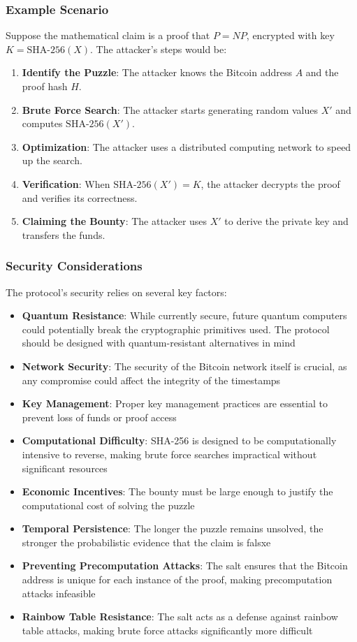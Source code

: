 \documentclass[12pt]{report}
\begin{document}
\subsubsection{Example Scenario}
Suppose the mathematical claim is a proof that \( P = NP \), encrypted with key \( K = \text{SHA-256}(X) \). The attacker's steps would be:

\begin{enumerate}
    \item \textbf{Identify the Puzzle}: The attacker knows the Bitcoin address \( A \) and the proof hash \( H \).
    \item \textbf{Brute Force Search}: The attacker starts generating random values \( X' \) and computes \( \text{SHA-256}(X') \).
    \item \textbf{Optimization}: The attacker uses a distributed computing network to speed up the search.
    \item \textbf{Verification}: When \( \text{SHA-256}(X') = K \), the attacker decrypts the proof and verifies its correctness.
    \item \textbf{Claiming the Bounty}: The attacker uses \( X' \) to derive the private key and transfers the funds.
\end{enumerate}

\subsubsection{Security Considerations}
The protocol's security relies on several key factors:
\begin{itemize}
    \item \textbf{Quantum Resistance}: While currently secure, future quantum computers could potentially break the cryptographic primitives used. The protocol should be designed with quantum-resistant alternatives in mind
    \item \textbf{Network Security}: The security of the Bitcoin network itself is crucial, as any compromise could affect the integrity of the timestamps
    \item \textbf{Key Management}: Proper key management practices are essential to prevent loss of funds or proof access
    \item \textbf{Computational Difficulty}: SHA-256 is designed to be computationally intensive to reverse, making brute force searches impractical without significant resources
    \item \textbf{Economic Incentives}: The bounty must be large enough to justify the computational cost of solving the puzzle
    \item \textbf{Temporal Persistence}: The longer the puzzle remains unsolved, the stronger the probabilistic evidence that the claim is falsxe
    \item \textbf{Preventing Precomputation Attacks}: The salt ensures that the Bitcoin address is unique for each instance of the proof, making precomputation attacks infeasible
    \item \textbf{Rainbow Table Resistance}: The salt acts as a defense against rainbow table attacks, making brute force attacks significantly more difficult
\end{itemize}
\end{document}
